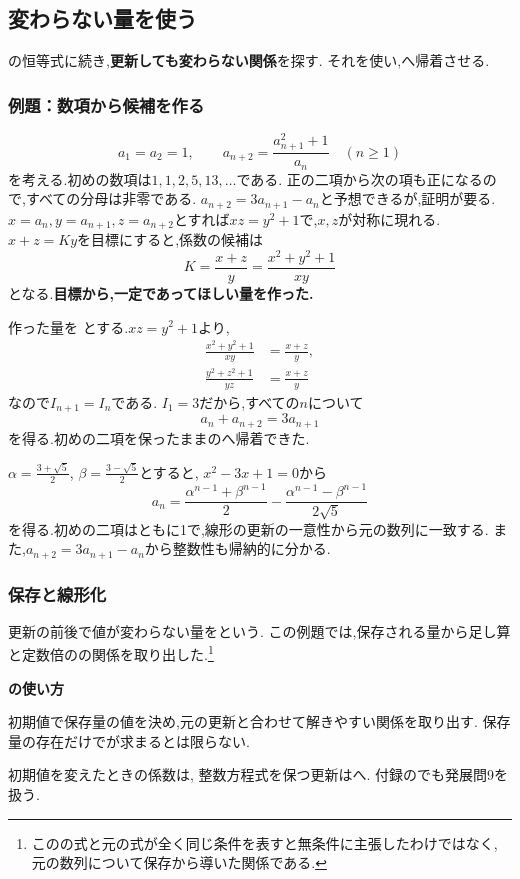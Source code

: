 \subsection{変わらない量を使う}\label{節：変わらない量を使う}
の恒等式に続き,\textbf{更新しても変わらない関係}を探す.
それを使い,へ帰着させる.

\subsubsection{例題：数項から候補を作る}
\[
  a_1=a_2=1,\qquad
  a_{n+2}=\frac{a_{n+1}^2+1}{a_n}\quad(n\ge1)
\]
を考える.初めの数項は$1,1,2,5,13,\ldots$である.
正の二項から次の項も正になるので,すべての分母は非零である.
$a_{n+2}=3a_{n+1}-a_n$と予想できるが,証明が要る.
$x=a_n,y=a_{n+1},z=a_{n+2}$とすれば$xz=y^2+1$で,$x,z$が対称に現れる.
$x+z=Ky$を目標にすると,係数の候補は
\[
  K=\frac{x+z}{y}=\frac{x^2+y^2+1}{xy}
\]
となる.\textbf{目標から,一定であってほしい量を作った.}

作った量を
\BookMathLayout{\[
    I_n=\frac{a_n^2+a_{n+1}^2+1}{a_na_{n+1}}
  \]}{\[
    \begin{aligned}
      I_n=\frac{a_n^2+a_{n+1}^2+1}{a_na_{n+1}}
    \end{aligned}
  \]}
とする.$xz=y^2+1$より,
\[
  \begin{aligned}
    \frac{x^2+y^2+1}{xy}&=\frac{x+z}{y},\\
    \frac{y^2+z^2+1}{yz}&=\frac{x+z}{y}
  \end{aligned}
\]
なので$I_{n+1}=I_n$である.
$I_1=3$だから,すべての$n$について
\[
  a_n+a_{n+2}=3a_{n+1}
\]
を得る.初めの二項を保ったままのへ帰着できた.

$\alpha=\frac{3+\sqrt5}{2}$, $\beta=\frac{3-\sqrt5}{2}$とすると,
$x^2-3x+1=0$から
\[
  a_n=\frac{\alpha^{n-1}+\beta^{n-1}}2
  -\frac{\alpha^{n-1}-\beta^{n-1}}{2\sqrt5}
\]
を得る.初めの二項はともに1で,線形の更新の一意性から元の数列に一致する.
また,$a_{n+2}=3a_{n+1}-a_n$から整数性も帰納的に分かる.

\subsubsection{保存と線形化}
更新の前後で値が変わらない量を\textbf{}という.
この例題では,保存される量から足し算と定数倍のの関係を取り出した.\footnote{このの式と元の式が全く同じ条件を表すと無条件に主張したわけではなく,
  元の数列について保存から導いた関係である.}

\begin{bookpoint}
  \textbf{の使い方}\par
  初期値で保存量の値を決め,元の更新と合わせて解きやすい関係を取り出す.
  保存量の存在だけでが求まるとは限らない.
\end{bookpoint}
初期値を変えたときの係数は,
整数方程式を保つ更新はへ.
付録のでも発展問9を扱う.
